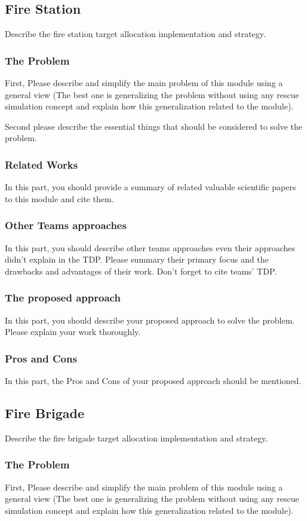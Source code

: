 \documentclass[runningheads,a4paper]{llncs}
\begin{document}
\subsection{Fire Station}
Describe the fire station target allocation implementation and strategy.
\subsubsection{The Problem}
First, Please describe and simplify the main problem of this module using a general view (The best one is generalizing the problem without using any rescue simulation concept and explain how this generalization related to the module).

Second please describe the essential things that should be considered to solve the problem.
\subsubsection{Related Works}
In this part, you should provide a summary of related valuable scientific papers to this module and cite them.
\subsubsection{Other Teams approaches}
In this part, you should describe other teams approaches even their approaches didn't explain in the TDP. Please summary their primary focus and the drawbacks and advantages of their work. Don't forget to cite teams' TDP.
\subsubsection{The proposed approach}
In this part, you should describe your proposed approach to solve the problem. Please explain your work thoroughly.
\subsubsection{Pros and Cons}
In this part, the Pros and Cons of your proposed approach should be mentioned.

\subsection{Fire Brigade}
Describe the fire brigade target allocation implementation and strategy.
\subsubsection{The Problem}
First, Please describe and simplify the main problem of this module using a general view (The best one is generalizing the problem without using any rescue simulation concept and explain how this generalization related to the module).
\end{document}
